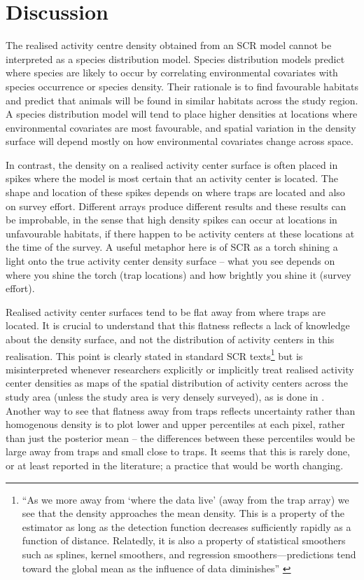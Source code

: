 \documentclass[10pt,a4paper]{article}
\begin{document}
\section{Discussion} \label{discussion}
The realised activity centre density obtained from an SCR model cannot be interpreted as a species distribution model. Species distribution models predict where species are likely to occur by correlating environmental covariates with species occurrence or species density. Their rationale is to find favourable habitats and predict that animals will be found in similar habitats across the study region. A species distribution model will tend to place higher densities at locations where environmental covariates are most favourable, and spatial variation in the density surface will depend mostly on how environmental covariates change across space.

In contrast, the density on a realised activity center surface is often placed in spikes where the model is most certain that an activity center is located. The shape and location of these spikes depends on where traps are located and also on survey effort. Different arrays produce different results and these results can be improbable, in the sense that high density spikes can occur at locations in unfavourable habitats, if there happen to be activity centers at these locations at the time of the survey. A useful metaphor here is of SCR as a torch shining a light onto the true activity center density surface -- what you see depends on where you shine the torch (trap locations) and how brightly you shine it (survey effort). 

Realised activity center surfaces tend to be flat away from where traps are located. It is crucial to understand that this flatness reflects a lack of knowledge about the density surface, and not the distribution of activity centers in this realisation. This point is clearly stated in standard SCR texts\footnote{``As we more away from `where the data live' (away from the trap array) we see that the density approaches the mean density. This is a property of the estimator as long as the detection function decreases sufficiently rapidly as a function of distance. Relatedly, it is also a property of statistical smoothers such as splines, kernel smoothers, and regression smoothers---predictions tend toward the global mean as the influence of data diminishes'' \citep[p165-166][]{Royle+al:13a}} but is misinterpreted whenever researchers explicitly or implicitly treat realised activity center densities as maps of the spatial distribution of activity centers across the study area (unless the study area is very densely surveyed), as is done in \cite{Alexander+al:15}. Another way to see that flatness away from traps reflects uncertainty rather than homogenous density is to plot lower and upper percentiles at each pixel, rather than just the posterior mean -- the differences between these percentiles would be large away from traps and small close to traps. It seems that this is rarely done, or at least reported in the literature; a practice that would be worth changing. 
\end{document}
